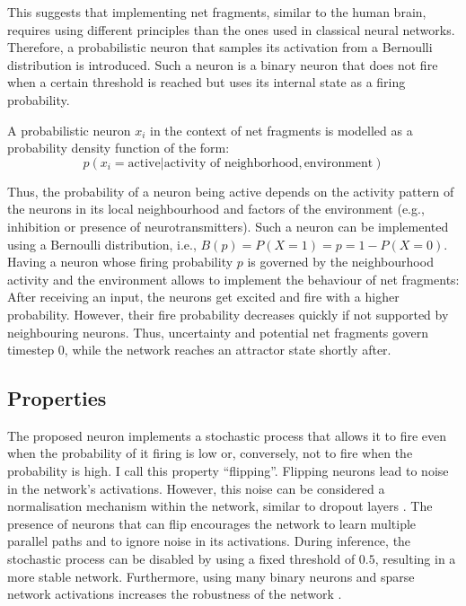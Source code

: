 This suggests that implementing net fragments, similar to the human brain, requires using different principles than the ones used in classical neural networks. Therefore, a probabilistic neuron that samples its activation from a Bernoulli distribution is introduced.
Such a neuron is a binary neuron that does not fire when a certain threshold is reached but uses its internal state as a firing probability.

A probabilistic neuron $x_i$ in the context of net fragments is modelled as a probability density function of the form:
\begin{equation}
    p(x_i = \text{active} | \text{activity of neighborhood}, \text{environment}) 
\end{equation}

Thus, the probability of a neuron being active depends on the activity pattern of the neurons in its local neighbourhood and factors of the environment (e.g., inhibition or presence of neurotransmitters).
Such a neuron can be implemented using a Bernoulli distribution, i.e., $B(p) = P(X = 1) = p = 1 - P(X=0)$. Having a neuron whose firing probability $p$ is governed by the neighbourhood activity and the environment allows to implement the behaviour of net fragments: After receiving an input, the neurons get excited and fire with a higher probability. However, their fire probability decreases quickly if not supported by neighbouring neurons. Thus, uncertainty and potential net fragments govern timestep 0, while the network reaches an attractor state shortly after. 

\subsection{Properties}
The proposed neuron implements a stochastic process that allows it to fire even when the probability of it firing is low or, conversely, not to fire when the probability is high.
I call this property ``flipping''.
Flipping neurons lead to noise in the network's activations.
However, this noise can be considered a normalisation mechanism within the network, similar to dropout layers .
The presence of neurons that can flip encourages the network to learn multiple parallel paths and to ignore noise in its activations. During inference, the stochastic process can be disabled by using a fixed threshold of $0.5$, resulting in a more stable network.
Furthermore, using many binary neurons and sparse network activations increases the robustness of the network \cite{ahmad_properties_2015}.

